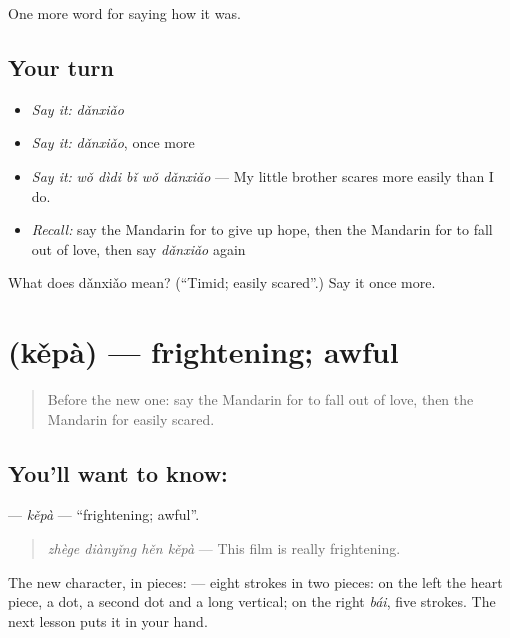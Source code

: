 \begin{grammarlens}[title={What you've built}]
One more word for saying how it was.
\end{grammarlens}

\subsection*{Your turn}
\begin{itemize}
\raggedright
  \item \emph{Say it:} \emph{dǎnxiǎo}
  \item \emph{Say it:} \emph{dǎnxiǎo}, once more
  \item \emph{Say it:} \emph{wǒ dìdi bǐ wǒ dǎnxiǎo} — My little brother scares more easily than I do.
  \item \emph{Recall:} say the Mandarin for to give up hope, then the Mandarin for to fall out of love, then say \emph{dǎnxiǎo} again
\end{itemize}

\begin{tcolorbox}[breakable,colback=teal!4,colframe=teal!35!black,title={Before you move on}]
What does dǎnxiǎo mean? (\textquotedblleft{}Timid; easily scared\textquotedblright{}.) Say it once more.
\end{tcolorbox}
\section[\texorpdfstring{\zh{可怕} (kěpà)}{可怕 (kěpà)}]{ (kěpà) — frightening; awful}

\label{lesson:ZH-C463-kepa}



\begin{quote}
Before the new one: say the Mandarin for to fall out of love, then the Mandarin for easily scared.
\end{quote}

\subsection*{You'll want to know: }
\textbf{} — \emph{kěpà} — \textquotedblleft{}frightening; awful\textquotedblright{}.

\begin{quote}
\emph{zhège diànyǐng hěn kěpà} — This film is really frightening.
\end{quote}

The new character, in pieces:  — eight strokes in two pieces: on the left the heart piece, a dot, a second dot and a long vertical; on the right  \emph{bái}, five strokes. The next lesson puts it in your hand.

